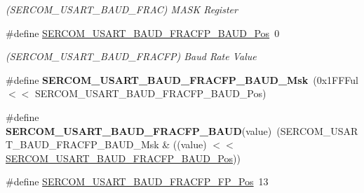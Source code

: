 \begin{DoxyCompactItemize}
\begin{DoxyCompactList}\small\item\em (S\+E\+R\+C\+O\+M\+\_\+\+U\+S\+A\+R\+T\+\_\+\+B\+A\+U\+D\+\_\+\+F\+R\+A\+C) M\+A\+S\+K Register \end{DoxyCompactList}\item 
\hypertarget{group___s_a_m_l21___s_e_r_c_o_m_ga083bb729d12647d6c3725d57ec7527f1}{}\#define \hyperlink{group___s_a_m_l21___s_e_r_c_o_m_ga083bb729d12647d6c3725d57ec7527f1}{S\+E\+R\+C\+O\+M\+\_\+\+U\+S\+A\+R\+T\+\_\+\+B\+A\+U\+D\+\_\+\+F\+R\+A\+C\+F\+P\+\_\+\+B\+A\+U\+D\+\_\+\+Pos}~0\label{group___s_a_m_l21___s_e_r_c_o_m_ga083bb729d12647d6c3725d57ec7527f1}

\begin{DoxyCompactList}\small\item\em (S\+E\+R\+C\+O\+M\+\_\+\+U\+S\+A\+R\+T\+\_\+\+B\+A\+U\+D\+\_\+\+F\+R\+A\+C\+F\+P) Baud Rate Value \end{DoxyCompactList}\item 
\hypertarget{group___s_a_m_l21___s_e_r_c_o_m_gaa8edc676242c34201ea800c38a5ae0b8}{}\#define {\bfseries S\+E\+R\+C\+O\+M\+\_\+\+U\+S\+A\+R\+T\+\_\+\+B\+A\+U\+D\+\_\+\+F\+R\+A\+C\+F\+P\+\_\+\+B\+A\+U\+D\+\_\+\+Msk}~(0x1\+F\+F\+Ful $<$$<$ S\+E\+R\+C\+O\+M\+\_\+\+U\+S\+A\+R\+T\+\_\+\+B\+A\+U\+D\+\_\+\+F\+R\+A\+C\+F\+P\+\_\+\+B\+A\+U\+D\+\_\+\+Pos)\label{group___s_a_m_l21___s_e_r_c_o_m_gaa8edc676242c34201ea800c38a5ae0b8}

\item 
\hypertarget{group___s_a_m_l21___s_e_r_c_o_m_ga859d36432b1cecaf6276ca6e538baea3}{}\#define {\bfseries S\+E\+R\+C\+O\+M\+\_\+\+U\+S\+A\+R\+T\+\_\+\+B\+A\+U\+D\+\_\+\+F\+R\+A\+C\+F\+P\+\_\+\+B\+A\+U\+D}(value)~(S\+E\+R\+C\+O\+M\+\_\+\+U\+S\+A\+R\+T\+\_\+\+B\+A\+U\+D\+\_\+\+F\+R\+A\+C\+F\+P\+\_\+\+B\+A\+U\+D\+\_\+\+Msk \& ((value) $<$$<$ \hyperlink{group___s_a_m_l21___s_e_r_c_o_m_ga083bb729d12647d6c3725d57ec7527f1}{S\+E\+R\+C\+O\+M\+\_\+\+U\+S\+A\+R\+T\+\_\+\+B\+A\+U\+D\+\_\+\+F\+R\+A\+C\+F\+P\+\_\+\+B\+A\+U\+D\+\_\+\+Pos}))\label{group___s_a_m_l21___s_e_r_c_o_m_ga859d36432b1cecaf6276ca6e538baea3}

\item 
\hypertarget{group___s_a_m_l21___s_e_r_c_o_m_ga72aa86a740a8156d437ce35cda870420}{}\#define \hyperlink{group___s_a_m_l21___s_e_r_c_o_m_ga72aa86a740a8156d437ce35cda870420}{S\+E\+R\+C\+O\+M\+\_\+\+U\+S\+A\+R\+T\+\_\+\+B\+A\+U\+D\+\_\+\+F\+R\+A\+C\+F\+P\+\_\+\+F\+P\+\_\+\+Pos}~13\label{group___s_a_m_l21___s_e_r_c_o_m_ga72aa86a740a8156d437ce35cda870420}


\end{DoxyCompactItemize}
